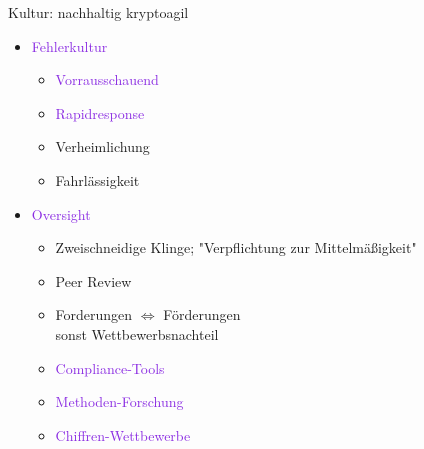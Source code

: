 \begin{frame}{Kultur: nachhaltig kryptoagil}



  \begin{itemize}
    \item \textcolor{BlueViolet}{Fehlerkultur}
    \begin{itemize}
      \item \textcolor{BlueViolet}{Vorrausschauend}
      \item \textcolor{BlueViolet}{Rapidresponse}
      \item \textcolor{BrickRed}{Verheimlichung}
      \item \textcolor{BrickRed}{Fahrlässigkeit}
    \end{itemize}

    \item \textcolor{BlueViolet}{Oversight}
    \begin{itemize}
      \item Zweischneidige Klinge; "Verpflichtung zur Mittelmäßigkeit"
      \item Peer Review
      \item Forderungen $\Leftrightarrow$ Förderungen \tiny \\ sonst Wettbewerbsnachteil
    \end{itemize}
    
    \begin{itemize}
      \item \textcolor{BlueViolet}{Compliance-Tools}
      \item \textcolor{BlueViolet}{Methoden-Forschung}
      \item \textcolor{BlueViolet}{Chiffren-Wettbewerbe}
    \end{itemize}
  \end{itemize}
\end{frame}


